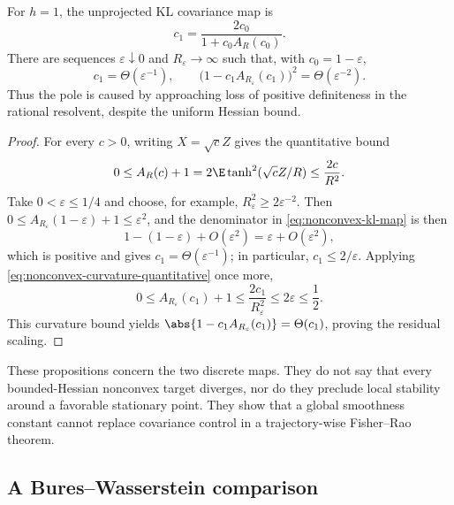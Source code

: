 \begin{proposition}
\label{prop:nonconvex-kl-pole}
For \(h=1\), the unprojected KL covariance map is
\begin{equation}
  c_1
  =
  \frac{2c_0}{1+c_0A_R(c_0)}.
  \label{eq:nonconvex-kl-map}
\end{equation}
There are sequences \(\varepsilon\downarrow0\) and \(R_\varepsilon\to\infty\)
such that, with \(c_0=1-\varepsilon\),
\[
  c_1=\Theta(\varepsilon^{-1}),
  \qquad
  \bigl(1-c_1A_{R_\varepsilon}(c_1)\bigr)^2
  =\Theta(\varepsilon^{-2}).
  \label{eq:nonconvex-kl-pole-scaling}
\]
Thus the pole is caused by approaching loss of positive definiteness in the
rational resolvent, despite the uniform Hessian bound.
\end{proposition}

\begin{proof}
For every \(c>0\), writing \(X=\sqrt c Z\) gives the quantitative bound
\begin{equation}
  0\leq A_R(c)+1
  =2\E\tanh^2(\sqrt c Z/R)
  \leq \frac{2c}{R^2}.
  \label{eq:nonconvex-curvature-quantitative}
\end{equation}
Take \(0<\varepsilon\leq1/4\) and choose, for example,
\(R_\varepsilon^2\geq2\varepsilon^{-2}\).  Then
\(0\leq A_{R_\varepsilon}(1-\varepsilon)+1\leq\varepsilon^2\), and the
denominator in
\eqref{eq:nonconvex-kl-map} is then
\[
  1-(1-\varepsilon)+O(\varepsilon^2)
  =\varepsilon+O(\varepsilon^2),
\]
which is positive and gives \(c_1=\Theta(\varepsilon^{-1})\); in particular,
\(c_1\leq2/\varepsilon\).  Applying
\eqref{eq:nonconvex-curvature-quantitative} once more,
\[
  0\leq A_{R_\varepsilon}(c_1)+1
  \leq \frac{2c_1}{R_\varepsilon^2}
  \leq2\varepsilon\leq\frac12.
\]
This curvature bound yields
\(\abs{1-c_1A_{R_\varepsilon}(c_1)}=\Theta(c_1)\), proving the
residual scaling.
\end{proof}

These propositions concern the two discrete maps.  They do not say that every
bounded-Hessian nonconvex target diverges, nor do they preclude local stability
around a favorable stationary point.  They show that a global smoothness
constant cannot replace covariance control in a trajectory-wise
Fisher--Rao theorem.

\subsection{A Bures--Wasserstein comparison}
\label{sec:nonconvex-bw}

